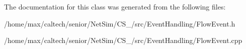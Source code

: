 \-The documentation for this class was generated from the following files\-:\begin{DoxyCompactItemize}
\item 
/home/max/caltech/senior/\-Net\-Sim/\-C\-S\-\_/src/\-Event\-Handling/\-Flow\-Event.\-h\item 
/home/max/caltech/senior/\-Net\-Sim/\-C\-S\-\_/src/\-Event\-Handling/\-Flow\-Event.\-cpp\end{DoxyCompactItemize}
